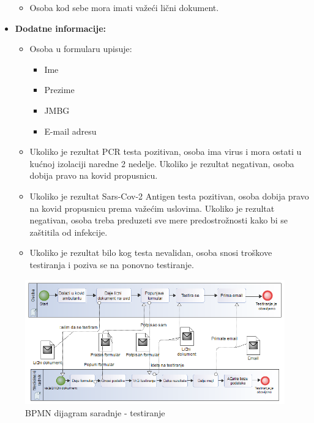 \documentclass[titlepage]{article}
\begin{document}
\begin{itemize}
        \begin{itemize}
            \item Osoba kod sebe mora imati važeći lični dokument.
        \end{itemize}
    \item \textbf{Dodatne informacije:}
        \begin{itemize}
            \item Osoba u formularu upisuje:
            \begin{itemize}
                \item Ime
                \item Prezime
                \item JMBG
                \item E-mail adresu
            \end{itemize}
            \item Ukoliko je rezultat PCR testa pozitivan, osoba ima virus i mora ostati u kućnoj izolaciji naredne 2 nedelje. Ukoliko je rezultat negativan, osoba dobija pravo na kovid propusnicu.
            \item Ukoliko je rezultat Sars-Cov-2 Antigen testa pozitivan, osoba dobija pravo na kovid propusnicu prema važećim uslovima. Ukoliko je rezultat negativan, osoba treba preduzeti sve mere predostrožnosti kako bi se zaštitila od infekcije.
            \item Ukoliko je rezultat bilo kog testa nevalidan, osoba snosi troškove testiranja i poziva se na ponovno testiranje.
        \end{itemize}
\end{itemize}

\begin{figure}[H]
\centering
\includegraphics[scale=0.5]{Dijagram_testiranje}
\caption{BPMN dijagram saradnje - testiranje}
\end{figure}
\end{document}
